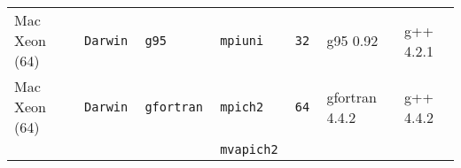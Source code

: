 \begin{tabular}{lllllll}
Mac Xeon (64)         &\tt Darwin &\tt g95          &\tt mpiuni     &\tt 32              & g95 \footnotesize 0.92             & g++ \footnotesize 4.2.1         \\ %
Mac Xeon (64)         &\tt Darwin &\tt gfortran     &\tt mpich2     &\tt 64              & gfortran \footnotesize 4.4.2       & g++ \footnotesize 4.4.2         \\ %
                      &           &                 &\tt mvapich2   &                    &                                    &                                 \\

\end{tabular}
